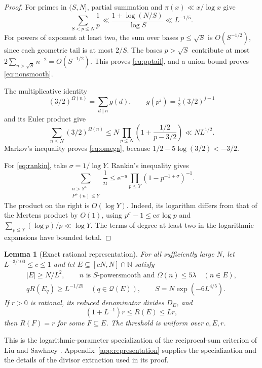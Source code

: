 \documentclass[11pt,leqno]{amsart}
\numberwithin{equation}{section}
\newtheorem{lemma}[theorem]{Lemma}
\theoremstyle{definition}
\theoremstyle{remark}
\newcommand{\N}{\mathbb N}
\newcommand{\e}{\mathrm e}
\newcommand{\pp}{\mathcal Q}
\newcommand{\Ph}{P^{+}}
\newcommand{\card}[1]{\lvert #1\rvert}
\begin{document}
\begin{proof}
For primes in $(S,N]$, partial summation and $\pi(x)\ll x/\log x$ give
\[
 \sum_{S<p\le N}\frac1p
 \ll \frac{1+\log(N/S)}{\log S}\ll L^{-1/5}.
\]
For powers of exponent at least two, the sum over bases $p\le\sqrt S$
is $O(S^{-1/2})$, since each geometric tail is at most $2/S$.
The bases $p>\sqrt S$ contribute at most
$2\sum_{n>\sqrt S}n^{-2}=O(S^{-1/2})$.
This proves \eqref{eq:pptail}, and a union bound proves
\eqref{eq:nonsmooth}.

The multiplicative identity
\[
 (3/2)^{\Omega(n)}=\sum_{d\mid n}g(d),\qquad
 g(p^j)=\tfrac12(3/2)^{j-1}
\]
and its Euler product give
\[
 \sum_{n\le N}(3/2)^{\Omega(n)}
 \le N\prod_{p\le N}\left(1+\frac{1/2}{p-3/2}\right)
 \ll N L^{1/2}.
\]
Markov's inequality proves \eqref{eq:omega}, because
$1/2-5\log(3/2)<-3/2$.

For \eqref{eq:rankin}, take $\sigma=1/\log Y$. Rankin's inequality gives
\[
 \sum_{\substack{n>Y^u\\\Ph(n)\le Y}}\frac1n
 \le \e^{-u}\prod_{p\le Y}(1-p^{-1+\sigma})^{-1}.
\]
The product on the right is $O(\log Y)$. Indeed, its logarithm differs
from that of the Mertens product by $O(1)$, using
$p^\sigma-1\le\e\sigma\log p$ and
$\sum_{p\le Y}(\log p)/p\ll\log Y$. The terms of degree at least two in
the logarithmic expansions have bounded total.
\end{proof}

\begin{lemma}[Exact rational representation]\label{lem:exact}
For all sufficiently large $N$, let
$L^{-3/100}\le c\le1$ and let $E\subseteq[cN,N]\cap\N$ satisfy
\begin{gather}
 \card E\ge N/L^2,\qquad
 n\text{ is }S\text{-powersmooth and }\Omega(n)\le5\lambda
 \quad(n\in E),\label{eq:exacthyp1}\\
 qR(E_q)\ge L^{-1/25}\quad(q\in\pp(E)),
 \qquad S=N\exp(-6L^{4/5}).\label{eq:exacthyp2}
\end{gather}
If $r>0$ is rational, its reduced denominator divides $D_E$, and
\begin{equation}\label{eq:targetrange}
 (1+L^{-1})r\le R(E)\le Lr,
\end{equation}
then $R(F)=r$ for some $F\subseteq E$.
The threshold is uniform over $c,E,r$.
\end{lemma}

This is the logarithmic-parameter specialization of the reciprocal-sum
criterion of Liu and Sawhney \cite[Proposition~5.2]{LS}.
Appendix~\ref{app:representation} supplies the specialization and the
details of the divisor extraction used in its proof.
\end{document}
